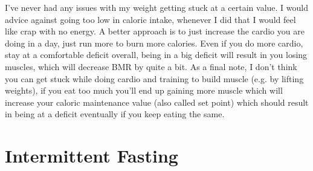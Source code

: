 \documentclass[openany, 12pt]{book}
\begin{document}
        I've never had any issues with my weight getting stuck at a certain value. I would advice against going too low in caloric intake, whenever I did that I would feel like crap with no energy.
        A better approach is to just increase the cardio you are doing in a day, just run more to burn more calories. Even if you do more cardio, stay at a comfortable deficit overall, being in
        a big deficit will result in you losing muscles, which will decrease BMR by quite a bit. As a final note, I don't think you can get stuck while doing cardio and training to build muscle
        (e.g. by lifting weights), if you eat too much you'll end up gaining more muscle which will increase your caloric maintenance value (also called set point) which should result in
        being at a deficit eventually if you keep eating the same.


        \section{Intermittent Fasting}
\end{document}
